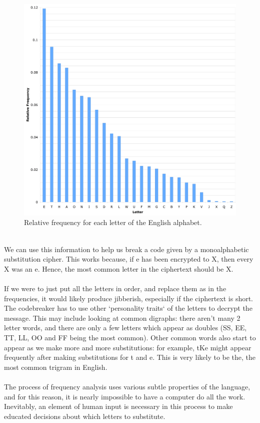 \documentclass[Lau,binding=0.6cm,oneside]{sapthesis}
\begin{document}
\begin{figure}[H]
\includegraphics[scale=0.35]{letter_frequency}
\centering
\caption{Relative frequency for each letter of the English alphabet.}
\centering
\end{figure}
\ \\
We can use this information to help us break a code given by a monoalphabetic substitution cipher. This works because, if \textsf{e} has been encrypted to \textsf{X}, then every \textsf{X} was an \textsf{e}. Hence, the most common letter in the ciphertext should be \textsf{X}.\\\\
If we were to just put all the letters in order, and replace them as in the frequencies, it would likely produce jibberish, especially if the ciphertext is short. The codebreaker has to use other `personality traits` of the letters to decrypt the message. This may include looking at common digraphs: there aren't many 2 letter words, and there are only a few letters which appear as doubles (\textsf{SS}, \textsf{EE}, \textsf{TT}, \textsf{LL}, \textsf{OO} and \textsf{FF} being the most common). Other common words also start to appear as we make more and more substitutions: for example, \textsf{tKe} might appear frequently after making substitutions for \textsf{t} and \textsf{e}. This is very likely to be \textsf{the}, the most common trigram in English.\\\\
The process of frequency analysis uses various subtle properties of the language, and for this reason, it is nearly impossible to have a computer do all the work. Inevitably, an element of human input is necessary in this process to make educated decisions about which letters to substitute.\\
\end{document}
